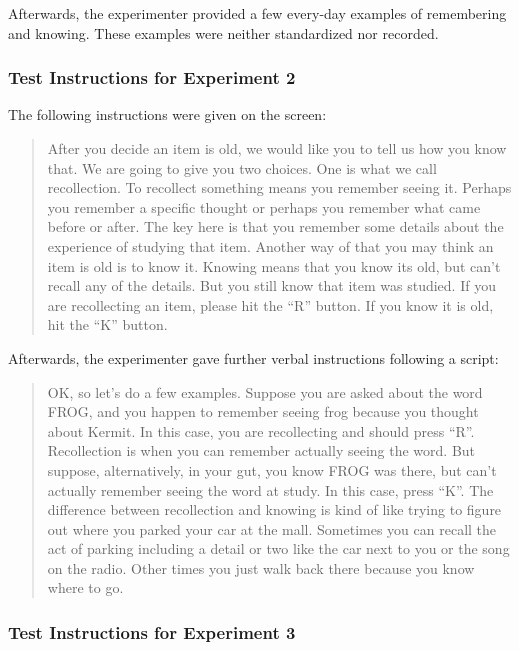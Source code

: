 \documentclass[english,,man,floatsintext]{apa6}
\begin{document}
Afterwards, the experimenter provided a few every-day examples of remembering and knowing. These examples were neither standardized nor recorded.

\hypertarget{test-instructions-for-experiment-2}{%
\subsubsection{Test Instructions for Experiment 2}\label{test-instructions-for-experiment-2}}

The following instructions were given on the screen:

\begin{quote}After you decide an item is old, we would like you to tell us how you know that.
We are going to give you two choices. One is what we call recollection. To recollect
something means you remember seeing it. Perhaps you remember a specific thought
or perhaps you remember what came before or after. The key here is that you
remember some details about the experience of studying that item. Another way of
that you may think an item is old is to know it. Knowing means that you know its
old, but can't recall any of the details. But you still know that item was studied. If
you are recollecting an item, please hit the ``R” button. If you know it is old, hit the
``K” button.
\end{quote}

Afterwards, the experimenter gave further verbal instructions following a script:

\begin{quote}OK, so let's do a few examples. Suppose you are asked about the word FROG,
and you happen to remember seeing frog because you thought about Kermit. In
this case, you are recollecting and should press ``R''. Recollection is when you can
remember actually seeing the word. But suppose, alternatively, in your gut, you
know FROG was there, but can't actually remember seeing the word at study. In
this case, press ``K''. The difference between recollection and knowing is kind of like
trying to figure out where you parked your car at the mall. Sometimes you can recall
the act of parking including a detail or two like the car next to you or the song on
the radio. Other times you just walk back there because you know where to go.
\end{quote}

\hypertarget{test-instructions-for-experiment-3}{%
\subsubsection{Test Instructions for Experiment 3}\label{test-instructions-for-experiment-3}}
\end{document}
